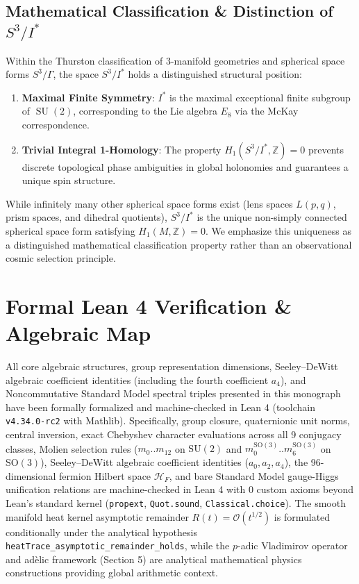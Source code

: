 \documentclass[11pt,a4paper]{article}
\theoremstyle{definition}
\DeclareMathOperator{\SU}{SU}
\begin{document}
\subsection{Mathematical Classification \& Distinction of $S^3 / I^*$}
Within the Thurston classification of 3-manifold geometries and spherical space forms $S^3 / \Gamma$, the space $S^3 / I^*$ holds a distinguished structural position:
\begin{enumerate}
\item \textbf{Maximal Finite Symmetry}: $I^*$ is the maximal exceptional finite subgroup of $\SU(2)$, corresponding to the Lie algebra $E_8$ via the McKay correspondence.
\item \textbf{Trivial Integral 1-Homology}: The property $H_1(S^3/I^*, \mathbb{Z}) = 0$ prevents discrete topological phase ambiguities in global holonomies and guarantees a unique spin structure.
\end{enumerate}
While infinitely many other spherical space forms exist (lens spaces $L(p, q)$, prism spaces, and dihedral quotients), $S^3/I^*$ is the unique non-simply connected spherical space form satisfying $H_1(M, \mathbb{Z}) = 0$. We emphasize this uniqueness as a distinguished mathematical classification property rather than an observational cosmic selection principle.

\section{Formal Lean 4 Verification \& Algebraic Map}

All core algebraic structures, group representation dimensions, Seeley--DeWitt algebraic coefficient identities (including the fourth coefficient $a_4$), and Noncommutative Standard Model spectral triples presented in this monograph have been formally formalized and machine-checked in Lean 4 (toolchain \texttt{v4.34.0-rc2} with Mathlib). Specifically, group closure, quaternionic unit norms, central inversion, exact Chebyshev character evaluations across all 9 conjugacy classes, Molien selection rules ($m_0..m_{12}$ on $\mathrm{SU}(2)$ and $m_0^{\mathrm{SO}(3)}..m_6^{\mathrm{SO}(3)}$ on $\mathrm{SO}(3)$), Seeley--DeWitt algebraic coefficient identities ($a_0, a_2, a_4$), the 96-dimensional fermion Hilbert space $\mathcal{H}_F$, and bare Standard Model gauge-Higgs unification relations are machine-checked in Lean 4 with 0 custom axioms beyond Lean's standard kernel (\texttt{propext}, \texttt{Quot.sound}, \texttt{Classical.choice}). The smooth manifold heat kernel asymptotic remainder $R(t) = \mathcal{O}(t^{1/2})$ is formulated conditionally under the analytical hypothesis \texttt{heatTrace\_asymptotic\_remainder\_holds}, while the $p$-adic Vladimirov operator and ad\`elic framework (Section 5) are analytical mathematical physics constructions providing global arithmetic context.
\end{document}
